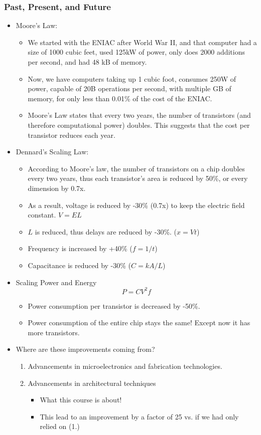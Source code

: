 \documentclass[10pt]{article}
\begin{document}
\subsubsection*{Past, Present, and Future}
\begin{itemize}
    \item Moore's Law: 
    \begin{itemize}
        \item We started with the ENIAC after World War II, and that computer had a size of 1000 cubic feet, used 125kW of power, only does 2000 additions per second, and had 48 kB of memory.
        \item Now, we have computers taking up 1 cubic foot, consumes 250W of power, capable of 20B operations per second, with multiple GB of memory, for only less than 0.01\% of the cost of the ENIAC.
        \item Moore's Law states that every two years, the number of transistors (and therefore computational power) doubles.  This suggests that the cost per transistor reduces each year.
    \end{itemize}
    \item Dennard's Scaling Law:
    \begin{itemize}
        \item According to Moore's law, the number of transistors on a chip doubles every two years, thus each transistor's area is reduced by 50\%, or every dimension by 0.7x.
        \item As a result, voltage is reduced by -30\% (0.7x) to keep the electric field constant.  $V = EL$
        \item $L$ is reduced, thus delays are reduced by -30\%.  ($x = Vt$)
        \item Frequency is increased by +40\% ($f = 1 / t$)
        \item Capacitance is reduced by -30\% ($C = kA/L$)
    \end{itemize}
    \item Scaling Power and Energy
    \[P = CV^2f\]
    \begin{itemize}
        \item Power consumption per transistor is decreased by -50\%.
        \item Power consumption of the entire chip stays the same!  Except now it has more transistors.
    \end{itemize}
    \item Where are these improvements coming from?
    \begin{enumerate}
        \item Advancements in microelectronics and fabrication technologies.
        \item Advancements in architectural techniques
        \begin{itemize}
            \item What this course is about!
            \item This lead to an improvement by a factor of 25 vs. if we had only relied on (1.)
        \end{itemize}
    \end{enumerate}
\end{itemize}
\end{document}
